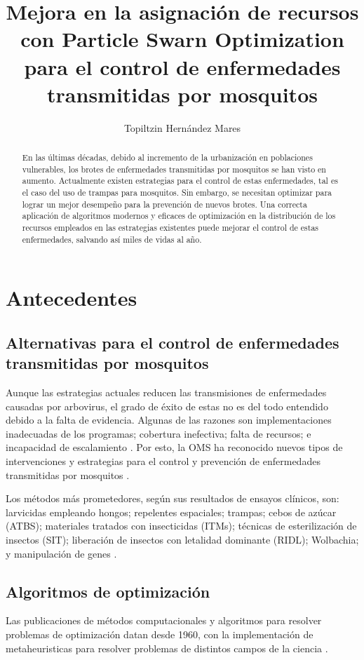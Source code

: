 \documentclass[letterpaper, 10pt, conference]{ieeeconf}
\title{\bf
  Mejora en la asignación de recursos con Particle Swarn Optimization para el control de enfermedades transmitidas por mosquitos
}
\author{Topiltzin Hernández Mares}
\begin{document}
\maketitle
\thispagestyle{empty}
\pagestyle{empty}

\begin{abstract}
  En las últimas décadas, debido al incremento de la urbanización en poblaciones vulnerables, los brotes de enfermedades transmitidas por mosquitos se han visto en aumento. Actualmente existen estrategias para el control de estas enfermedades, tal es el caso del uso de trampas para mosquitos. Sin embargo, se necesitan optimizar para lograr un mejor desempeño para la prevención de nuevos brotes. Una correcta aplicación de algoritmos modernos y eficaces de optimización en la distribución de los recursos empleados en las estrategias existentes puede mejorar el control de estas enfermedades, salvando así miles de vidas al año.
\end{abstract}

\section{Antecedentes}

\subsection{Alternativas para el control de enfermedades transmitidas por mosquitos}
Aunque las estrategias actuales reducen las transmisiones de enfermedades causadas por arbovirus, el grado de éxito de estas no es del todo entendido debido a la falta de evidencia. Algunas de las razones son implementaciones inadecuadas de los programas; cobertura inefectiva; falta de recursos; e incapacidad de escalamiento \cite{AltStrategies}. Por esto, la OMS ha reconocido nuevos tipos de intervenciones y estrategias para el control y prevención de enfermedades transmitidas por mosquitos \cite{WHOOverviewVCAG}.

Los métodos más prometedores, según sus resultados de ensayos clínicos, son: larvicidas empleando hongos; repelentes espaciales; trampas; cebos de azúcar (ATBS); materiales tratados con insecticidas (ITMs); técnicas de esterilización de insectos (SIT); liberación de insectos con letalidad dominante (RIDL); Wolbachia; y manipulación de genes \cite{AltStrategies}.

\subsection{Algoritmos de optimización}
Las publicaciones de métodos computacionales y algoritmos para resolver problemas de optimización datan desde 1960, con la implementación de metaheuristicas para resolver problemas de distintos campos de la ciencia \cite{SwarmVsEvol}.
\end{document}
